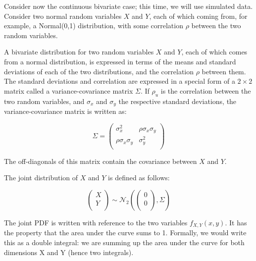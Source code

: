 \documentclass[12pt,]{krantz}
\theoremstyle{definition}
\theoremstyle{definition}
\theoremstyle{definition}
\theoremstyle{remark}
\begin{document}
Consider now the continuous bivariate case; this time, we will use
simulated data. Consider two normal random variables \(X\) and \(Y\),
each of which coming from, for example, a Normal(0,1) distribution, with
some correlation \(\rho\) between the two random variables.

A bivariate distribution for two random variables \(X\) and \(Y\), each
of which comes from a normal distribution, is expressed in terms of the
means and standard deviations of each of the two distributions, and the
correlation \(\rho\) between them. The standard deviations and
correlation are expressed in a special form of a \(2\times 2\) matrix
called a variance-covariance matrix \(\Sigma\). If \(\rho_u\) is the
correlation between the two random variables, and \(\sigma _{x}\) and
\(\sigma _{y}\) the respective standard deviations, the
variance-covariance matrix is written as:

\begin{equation}\label{eq:covmatfoundations}
\Sigma
=
\begin{pmatrix}
\sigma _{x}^2  & \rho\sigma _{x}\sigma _{y}\\
\rho\sigma _{x}\sigma _{y}    & \sigma _{y}^2\\
\end{pmatrix}
\end{equation}

The off-diagonals of this matrix contain the covariance between \(X\)
and \(Y\).

The joint distribution of \(X\) and \(Y\) is defined as follows:

\begin{equation}\label{eq:jointpriordistfoundations}
\begin{pmatrix}
  X \\ 
  Y \\
\end{pmatrix}
\sim 
\mathcal{N}_2 \left(
\begin{pmatrix}
  0 \\
  0 \\
\end{pmatrix},
\Sigma
\right)
\end{equation}

The joint PDF is written with reference to the two variables
\(f_{X,Y}(x,y)\). It has the property that the area under the curve sums
to 1. Formally, we would write this as a double integral: we are summing
up the area under the curve for both dimensions X and Y (hence two
integrals).
\end{document}
